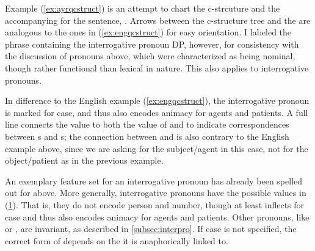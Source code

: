 Example (\ref{ex:ayrqcstruct}) is an attempt to chart the c-strcuture and the
accompanying \Avm{} for the sentence, .
Arrows between the c-structure tree and the \Avm{} are analogous to the ones in
(\ref{ex:engqcstruct}) for easy orientation. I labeled the phrase containing
the interrogative pronoun DP, however, for consistency with the discussion of
pronouns above, which were characterized as being nominal, though rather
functional than lexical in nature. This also applies to interrogative pronouns.

In difference to the English example (\ref{ex:engqcstruct}), the interrogative
pronoun is marked for case, and thus also encodes animacy for agents and
patients. A full line connects the \Foc{} value to both the value of \Q{} and
\Subj{} to indicate correspondences between \DF{}s and \GF{}s; the connection
between \Foc{} and \Subj{} is also contrary to the English example above, since
we are asking for the subject/agent in this case, not for the object/patient as
in the previous example.

An exemplary feature set for an interrogative pronoun has already been spelled
out for  above. More generally, interrogative pronouns
have the possible values in (\ref{ex:interpromorphlex}). That is, they do not
encode person and number, though at least  inflects for case
and thus also encodes animacy for agents and patients. Other pronouns, like
 or , are invariant, as
described in \autoref{subsec:interpro}. If case is not specified, the correct
form of  depends on the \GF{} it is anaphorically linked to.

\begin{figure}[h]
\begin{morphlex}
\ex\label{ex:interpromorphlex}
\xe
\end{morphlex}
\end{figure}


